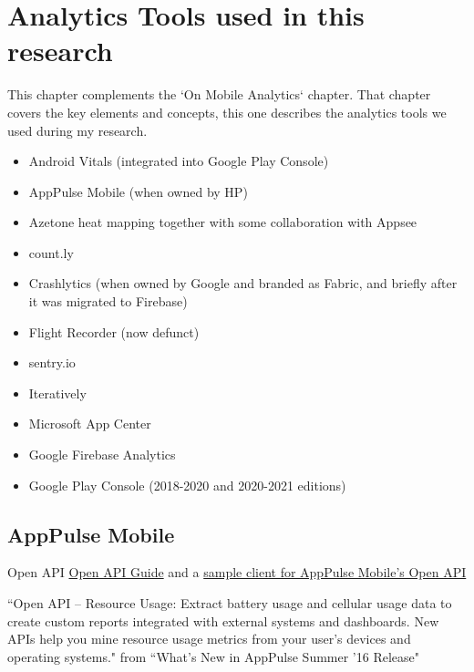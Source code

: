 \chapter{Analytics Tools used in this research}
\label{appendix-analytics-tools}

This chapter complements the `On Mobile Analytics` chapter. That chapter covers the key elements and concepts, this one describes the analytics tools we used during my research.

\begin{itemize}
    \item Android Vitals (integrated into Google Play Console)
    \item AppPulse Mobile (when owned by HP)
    \item Azetone heat mapping together with some collaboration with Appsee
    \item count.ly
    \item Crashlytics (when owned by Google and branded as Fabric, and briefly after it was migrated to Firebase)
    \item Flight Recorder (now defunct)
    \item sentry.io
    \item Iteratively
    \item Microsoft App Center
    \item Google Firebase Analytics
    \item Google Play Console (2018-2020 and 2020-2021 editions)
\end{itemize}


\section{AppPulse Mobile}

Open API \href{https://github.com/MicroFocus/apmobile-openapiclient/blob/master/doc/AppPulse_Mobile_Open_API_Guide.pdf}{Open API Guide} and a  \href{https://github.com/MicroFocus/apmobile-openapiclient}{sample client for AppPulse Mobile's Open API}

``Open API – Resource Usage: Extract battery usage and cellular usage data to create custom reports integrated with external systems and dashboards. New APIs help you mine resource usage metrics from your user’s devices and operating systems." from ``What's New in AppPulse Summer '16 Release"

